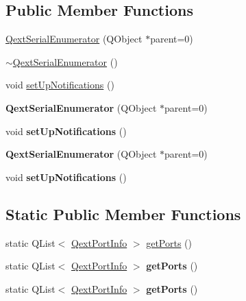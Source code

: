 \subsection*{Public Member Functions}
\begin{DoxyCompactItemize}
\item 
\mbox{\hyperlink{class_qext_serial_enumerator_a85e0cdb6b81ac537d4ab7050498778fd}{Qext\+Serial\+Enumerator}} (Q\+Object $\ast$parent=0)
\item 
\mbox{\hyperlink{class_qext_serial_enumerator_a150dc651f1a47a6fdb85933d115659d1}{$\sim$\+Qext\+Serial\+Enumerator}} ()
\item 
void \mbox{\hyperlink{class_qext_serial_enumerator_a8879197538e52cc9e4ad6a8902c50187}{set\+Up\+Notifications}} ()
\item 
\mbox{\label{class_qext_serial_enumerator_a85e0cdb6b81ac537d4ab7050498778fd}} 
{\bfseries Qext\+Serial\+Enumerator} (Q\+Object $\ast$parent=0)
\item 
\mbox{\label{class_qext_serial_enumerator_a8879197538e52cc9e4ad6a8902c50187}} 
void {\bfseries set\+Up\+Notifications} ()
\item 
\mbox{\label{class_qext_serial_enumerator_a85e0cdb6b81ac537d4ab7050498778fd}} 
{\bfseries Qext\+Serial\+Enumerator} (Q\+Object $\ast$parent=0)
\item 
\mbox{\label{class_qext_serial_enumerator_a8879197538e52cc9e4ad6a8902c50187}} 
void {\bfseries set\+Up\+Notifications} ()
\end{DoxyCompactItemize}
\subsection*{Static Public Member Functions}
\begin{DoxyCompactItemize}
\item 
static Q\+List$<$ \mbox{\hyperlink{struct_qext_port_info}{Qext\+Port\+Info}} $>$ \mbox{\hyperlink{class_qext_serial_enumerator_a6d8b9a5aece0a1419ceeef96e4401f88}{get\+Ports}} ()
\item 
\mbox{\label{class_qext_serial_enumerator_ae89d05c70544ee97f358c91f736bcf77}} 
static Q\+List$<$ \mbox{\hyperlink{struct_qext_port_info}{Qext\+Port\+Info}} $>$ {\bfseries get\+Ports} ()
\item 
\mbox{\label{class_qext_serial_enumerator_ae89d05c70544ee97f358c91f736bcf77}} 
static Q\+List$<$ \mbox{\hyperlink{struct_qext_port_info}{Qext\+Port\+Info}} $>$ {\bfseries get\+Ports} ()
\end{DoxyCompactItemize}


